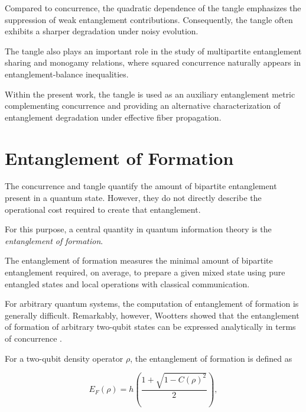 Compared to concurrence, the quadratic dependence of the tangle emphasizes the suppression of weak entanglement contributions. Consequently, the tangle often exhibits a sharper degradation under noisy evolution.

\medskip

The tangle also plays an important role in the study of multipartite entanglement sharing and monogamy relations, where squared concurrence naturally appears in entanglement-balance inequalities.

\medskip

Within the present work, the tangle is used as an auxiliary entanglement metric complementing concurrence and providing an alternative characterization of entanglement degradation under effective fiber propagation.


\section{Entanglement of Formation}

The concurrence and tangle quantify the amount of bipartite entanglement present in a quantum state. However, they do not directly describe the operational cost required to create that entanglement.

For this purpose, a central quantity in quantum information theory is the \emph{entanglement of formation}.

\medskip

The entanglement of formation measures the minimal amount of bipartite entanglement required, on average, to prepare a given mixed state using pure entangled states and local operations with classical communication.

\medskip

For arbitrary quantum systems, the computation of entanglement of formation is generally difficult. Remarkably, however, Wootters showed that the entanglement of formation of arbitrary two-qubit states can be expressed analytically in terms of concurrence \cite{wootters_entanglement_1998}.

\medskip

For a two-qubit density operator \( \rho \), the entanglement of formation is defined as

\begin{equation}
E_F(\rho)
=
h
\left(
\frac{
1
+
\sqrt{1-C(\rho)^2}
}{2}
\right),
\label{eq:eof_definition}
\end{equation}

